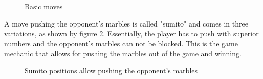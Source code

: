 \documentclass{../llncs}
\begin{document}
\begin{figure}[!h]
	\centering
	\hfill
	\hfill
	\caption{Basic moves \cite{abalone_sa_abalone_nodate}}
	\label{basics}
\end{figure}
A move pushing the opponent's marbles is called "sumito" and comes in three variations, as shown by figure \ref{sumito}. Essentially, the player has to push with superior numbers and the opponent's marbles can not be blocked. This is the game mechanic that allows for pushing the marbles out of the game and winning.

\begin{figure}[!h]
	\centering
	\hfill
	\hfill
	\caption{Sumito positions allow pushing the opponent's marbles \cite{abalone_sa_abalone_nodate}}
	\label{sumito}
\end{figure}
\end{document}
